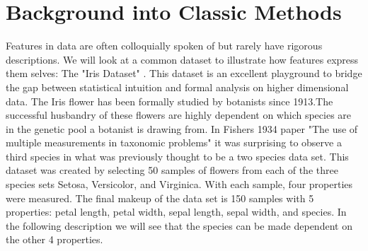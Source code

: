 \section{Background into Classic Methods}



Features in data are often colloquially spoken of but rarely have rigorous descriptions. We will look at a common dataset to illustrate how features express them selves: The "Iris Dataset"\cite{Iris:Fisher} . This dataset is an excellent playground to bridge the gap between statistical intuition and formal analysis on higher dimensional data. The Iris flower has been formally studied by botanists since 1913.The successful husbandry of these flowers are highly dependent on which species are in the genetic pool a botanist is drawing from. In Fishers 1934 paper "The use of multiple measurements in taxonomic problems" \cite{Iris:Fisher} it was surprising to observe a third species in what was previously thought to be a two species data set. This dataset was created by selecting 50 samples of flowers from each of the three species sets Setosa, Versicolor, and Virginica. With each sample, four properties were measured. The final makeup of the data set is 150 samples with 5 properties: petal length, petal width, sepal length, sepal width, and species. In the following description we will see that the species can be made dependent on the other 4 properties. 

